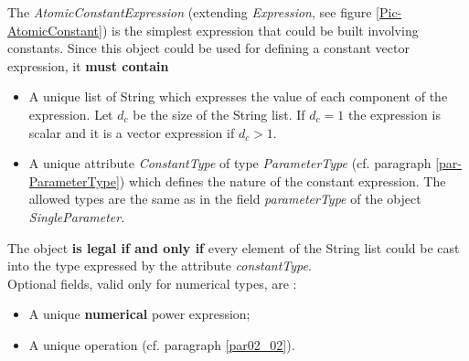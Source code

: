 \documentclass[a4paper,11pt] {ivoa}
\begin{document}
The {\it AtomicConstantExpression} (extending {\it Expression}, see figure \ref{Pic-AtomicConstant})
is the simplest expression that could be built involving constants. Since this object could be used
for defining a constant vector expression, it {\bf must contain}
\begin{itemize}
\item A unique list of String which expresses the value of each component of the expression. Let
$d_c$ be the size of the String list. If $d_c=1$ the expression is scalar and it is a vector
expression if $d_c>1$.
\item A unique attribute {\it ConstantType} of type {\it ParameterType} (cf. paragraph
\ref{par-ParameterType}) which defines the nature of the constant expression. The allowed
types are the same as in the field {\it parameterType} of the object {\it SingleParameter}.
\end{itemize}
The object {\bf is legal if and only if} every element of the String list could be cast into the
type expressed by the attribute {\it constantType}.\\

Optional fields, valid only for numerical types, are : 
\begin{itemize}
\item A unique {\bf numerical} power expression;
\item A unique operation (cf. paragraph \ref{par02_02}).
\end{itemize}
\end{document}

